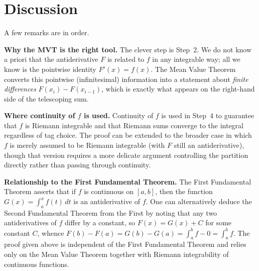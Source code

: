 \documentclass{article}
\theoremstyle{remark}
\begin{document}
\section*{Discussion}

A few remarks are in order.

\textbf{Why the MVT is the right tool.} The clever step is Step~2. We do not know a priori that the antiderivative $F$ is related to $f$ in any integrable way; all we know is the pointwise identity $F'(x) = f(x)$. The Mean Value Theorem converts this pointwise (infinitesimal) information into a statement about \emph{finite differences} $F(x_i) - F(x_{i-1})$, which is exactly what appears on the right-hand side of the telescoping sum.

\textbf{Where continuity of $f$ is used.} Continuity of $f$ is used in Step~4 to guarantee that $f$ is Riemann integrable and that Riemann sums converge to the integral regardless of tag choice. The proof can be extended to the broader case in which $f$ is merely assumed to be Riemann integrable (with $F$ still an antiderivative), though that version requires a more delicate argument controlling the partition directly rather than passing through continuity.

\textbf{Relationship to the First Fundamental Theorem.} The First Fundamental Theorem asserts that if $f$ is continuous on $[a,b]$, then the function $G(x) = \int_a^x f(t)\,dt$ is an antiderivative of $f$. One can alternatively deduce the Second Fundamental Theorem from the First by noting that any two antiderivatives of $f$ differ by a constant, so $F(x) = G(x) + C$ for some constant $C$, whence $F(b) - F(a) = G(b) - G(a) = \int_a^b f - 0 = \int_a^b f$. The proof given above is independent of the First Fundamental Theorem and relies only on the Mean Value Theorem together with Riemann integrability of continuous functions.
\end{document}

